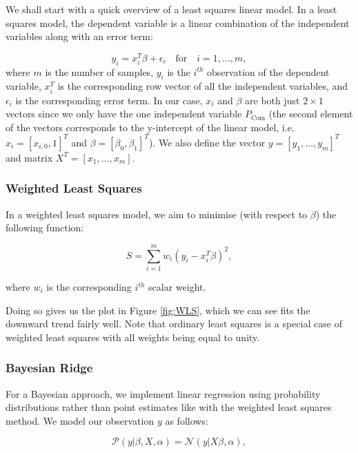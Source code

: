 \documentclass[11pt]{article}
\begin{document}
We shall start with a quick overview of a least squares linear model. In a least squares model, the dependent variable is a linear combination of the independent variables along with an error term:

\begin{equation}
	\label{eq:LS}
    y_{i}=x^{T}_{i}\beta + \epsilon_{i} \quad \textrm{for} \quad i=1,...,m,
\end{equation}
where $m$ is the number of samples, $y_{i}$ is the $i^{th}$ observation of the dependent variable, $x^{T}_{i}$ is the corresponding row vector of all the independent variables, and $\epsilon_{i}$ is the corresponding error term. In our case, $x_{i}$ and $\beta$ are both just $2\times1$ vectors since we only have the one independent variable $P_{\text{Com}}$ (the second element of the vectors corresponds to the y-intercept of the linear model, i.e. $x_{i}=[x_{i,0},1]^{T}$ and $\beta=[\beta_{0},\beta_{1}]^{T}$). We also define the vector $y = [y_{1},...,y_{m}]^{T}$ and matrix $X^{T} = [x_{1},...,x_{m}]$.


\subsubsection*{Weighted Least Squares}

In a weighted least squares model, we aim to minimise (with respect to $\beta$) the following function:

\begin{equation}
	\label{eq:WLS}
    S=\sum^{m}_{i=1} w_{i}(y_{i}-x^{T}_{i}\beta)^{2},
\end{equation}

where $w_{i}$ is the corresponding $i^{th}$ scalar weight.

Doing so gives us the plot in Figure \ref{fig:WLS}, which we can see fits the downward trend fairly well. Note that ordinary least squares is a special case of weighted least squares with all weights being equal to unity.

\subsubsection*{Bayesian Ridge}
For a Bayesian approach, we implement linear regression using probability distributions rather than point estimates like with the weighted least squares method. We model our observation $y$ as follows:

\begin{equation}
	\label{eq:likelihood}
    \mathcal{P}(y | \beta, X, \alpha) = \mathcal{N}(y | X\beta, \alpha),
\end{equation}
\end{document}
